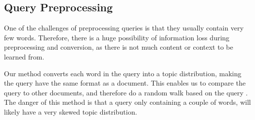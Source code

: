 \subsection{Query Preprocessing}
One of the challenges of preprocessing queries is that they usually contain very few words.
Therefore, there is a huge possibility of information loss during preprocessing and conversion, as there is not much content or context to be learned from.

Our method converts each word in the query into a topic distribution, making the query have the same format as a document. 
This enables us to compare the query to other documents, and therefore do a random walk based on the query .
The danger of this method is that a query only containing a couple of words, will likely have a very skewed topic distribution.
